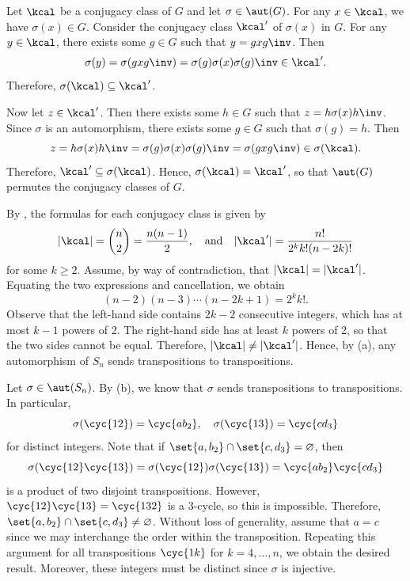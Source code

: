 \begin{solenum}[spsol]
	\item Let $\kcal$ be a conjugacy class of $G$ and let $\sigma \in \aut(G)$.
	For any $x \in \kcal$, we have $\sigma(x) \in G$.
	Consider the conjugacy class $\kcal'$ of $\sigma(x)$ in $G$.
	For any $y \in \kcal$, there exists some $g \in G$ such that $y = gxg\inv$.
	Then
	\[
		\sigma(y) = \sigma(gxg\inv) = \sigma(g)\sigma(x)\sigma(g)\inv \in \kcal'.
	\]
	Therefore, $\sigma(\kcal) \subseteq \kcal'$.

	Now let $z \in \kcal'$.
	Then there exists some $h \in G$ such that $z = h\sigma(x)h\inv$.
	Since $\sigma$ is an automorphism, there exists some $g \in G$ such that $\sigma(g) = h$.
	Then
	\[
		z = h\sigma(x)h\inv = \sigma(g)\sigma(x)\sigma(g)\inv = \sigma(gxg\inv) \in \sigma(\kcal).
	\]
	Therefore, $\kcal' \subseteq \sigma(\kcal)$.
	Hence, $\sigma(\kcal) = \kcal'$, so that $\aut(G)$ permutes the conjugacy classes of $G$.
	\item By , the formulas for each conjugacy class is given by
	\[
		|\kcal| = \binom n2 = \frac{n(n - 1)}{2}, \quad \text{and} \quad |\kcal'| = \frac{n!}{2^k k! (n - 2k)!}
	\]
	for some $k \geq 2$.
	Assume, by way of contradiction, that $|\kcal| = |\kcal'|$.
	Equating the two expressions and cancellation, we obtain
	\[
		(n - 2)(n - 3) \cdots (n - 2k + 1) = 2^k k!.
	\]
	Observe that the left-hand side contains $2k - 2$ consecutive integers, which has at most $k - 1$ powers of 2.
	The right-hand side has at least $k$ powers of 2, so that the two sides cannot be equal.
	Therefore, $|\kcal| \neq |\kcal'|$.
	Hence, by (a), any automorphism of $S_n$ sends transpositions to transpositions.
	\item Let $\sigma \in \aut(S_n)$.
	By (b), we know that $\sigma$ sends transpositions to transpositions.
	In particular,
	\[
		\sigma(\cyc{1 2}) = \cyc{a b_2}, \quad \sigma(\cyc{1 3}) = \cyc{c d_3}
	\]
	for distinct integers.
	Note that if $\set{a, b_2} \cap \set{c, d_3} = \varnothing$, then
	\[
		\sigma(\cyc{1 2}\cyc{1 3}) = \sigma(\cyc{1 2})\sigma(\cyc{1 3}) = \cyc{a b_2}\cyc{c d_3}
	\]
	is a product of two disjoint transpositions.
	However, $\cyc{1 2}\cyc{1 3} = \cyc{1 3 2}$ is a 3-cycle, so this is impossible.
	Therefore, $\set{a, b_2} \cap \set{c, d_3} \neq \varnothing$.
	Without loss of generality, assume that $a = c$ since we may interchange the order within the transposition.
	Repeating this argument for all transpositions $\cyc{1 k}$ for $k = 4, \ldots, n$, we obtain the desired result.
	Moreover, these integers must be distinct since $\sigma$ is injective.

\end{solenum}
